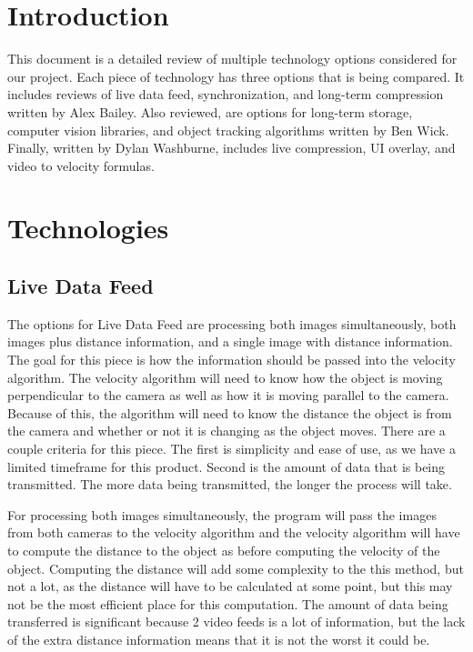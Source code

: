 \documentclass[onecolumn, draftclsnofoot,10pt, compsoc]{IEEEtran}
\begin{document}
\section{Introduction}
This document is a detailed review of multiple technology options considered for our project. Each piece of technology has three options that is being compared. It includes reviews of live data feed, synchronization, and long-term compression written by Alex Bailey. Also reviewed, are options for long-term storage, computer vision libraries, and object tracking algorithms written by Ben Wick. Finally, written by Dylan Washburne, includes live compression, UI overlay, and video to velocity formulas.

\section{Technologies}

\subsection{Live Data Feed} %



The options for Live Data Feed are processing both images simultaneously, both images plus distance information, and a single image with distance information.
The goal for this piece is how the information should be passed into the velocity algorithm.
The velocity algorithm will need to know how the object is moving perpendicular to the camera as well as how it is moving parallel to the camera.
Because of this, the algorithm will need to know the distance the object is from the camera and whether or not it is changing as the object moves.
There are a couple criteria for this piece.
The first is simplicity and ease of use, as we have a limited timeframe for this product.
Second is the amount of data that is being transmitted.
The more data being transmitted, the longer the process will take.

For processing both images simultaneously, the program will pass the images from both cameras to the velocity algorithm and the velocity algorithm will have to compute the distance to the object as before computing the velocity of the object.
Computing the distance will add some complexity to the this method, but not a lot, as the distance will have to be calculated at some point, but this may not be the most efficient place for this computation.
The amount of data being transferred is significant because 2 video feeds is a lot of information, but the lack of the extra distance information means that it is not the worst it could be.
\end{document}
